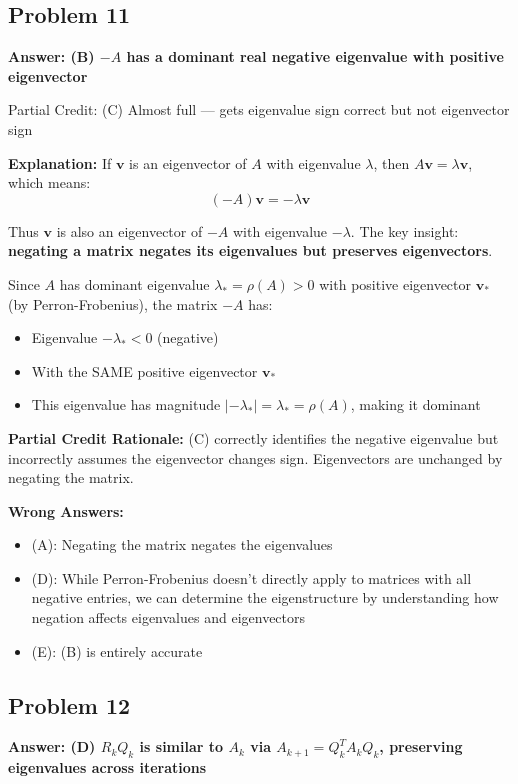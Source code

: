 \documentclass[12pt]{amsart}
\newcommand{\correct}[1]{{\color{correctgreen}\textbf{#1}}}
\newcommand{\partcred}[1]{{\color{partialblue}#1}}
\begin{document}
\subsection*{Problem 11}
\correct{Answer: (B) $-A$ has a dominant real negative eigenvalue with positive eigenvector}

\partcred{Partial Credit: (C) Almost full — gets eigenvalue sign correct but not eigenvector sign}

\textbf{Explanation:} If $\mathbf{v}$ is an eigenvector of $A$ with eigenvalue $\lambda$, then $A\mathbf{v} = \lambda\mathbf{v}$, which means:
$$(-A)\mathbf{v} = -\lambda\mathbf{v}$$

Thus $\mathbf{v}$ is also an eigenvector of $-A$ with eigenvalue $-\lambda$. The key insight: \textbf{negating a matrix negates its eigenvalues but preserves eigenvectors}.

Since $A$ has dominant eigenvalue $\lambda_* = \rho(A) > 0$ with positive eigenvector $\mathbf{v}_*$ (by Perron-Frobenius), the matrix $-A$ has:
\begin{itemize}
\item Eigenvalue $-\lambda_* < 0$ (negative)
\item With the SAME positive eigenvector $\mathbf{v}_*$
\item This eigenvalue has magnitude $|-\lambda_*| = \lambda_* = \rho(A)$, making it dominant
\end{itemize}

\textbf{Partial Credit Rationale:} (C) correctly identifies the negative eigenvalue but incorrectly assumes the eigenvector changes sign. Eigenvectors are unchanged by negating the matrix.

\textbf{Wrong Answers:}
\begin{itemize}
\item (A): Negating the matrix negates the eigenvalues
\item (D): While Perron-Frobenius doesn't directly apply to matrices with all negative entries, we can determine the eigenstructure by understanding how negation affects eigenvalues and eigenvectors
\item (E): (B) is entirely accurate
\end{itemize}

\subsection*{Problem 12}
\correct{Answer: (D) $R_k Q_k$ is similar to $A_k$ via $A_{k+1} = Q_k^T A_k Q_k$, preserving eigenvalues across iterations}
\end{document}
